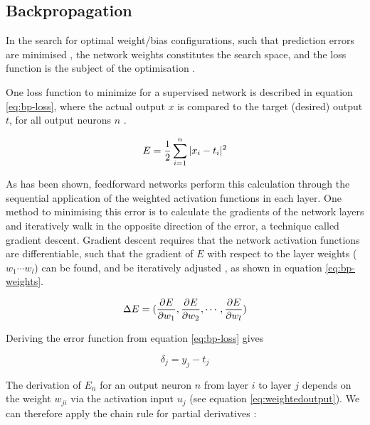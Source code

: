 \documentclass[report.tex]{subfiles}
\begin{document}
\subsection{Backpropagation}
In the search for optimal weight/bias configurations,
such that prediction errors are minimised \cite{Rumelhart1988},
the network weights constitutes the search space, 
and the loss function 
is the subject of the optimisation \cite{Russel2007}.

One loss function to minimize for a supervised network
is described in equation \ref{eq:bp-loss},
where the actual output $x$ is compared to the 
target (desired) output $t$, for all output neurons $n$
\cite{Russel2007}.

\begin{equation}
  E = {1 \over 2} \sum_{i=1}^n |x_i - t_i|^2
  \label{eq:bp-loss}
\end{equation}

As has been shown, feedforward networks perform this calculation
through the sequential application of the weighted activation
functions in each layer.
One method to minimising this error is
to calculate the gradients of the network layers and iteratively walk in
the opposite direction of the error, a technique called gradient
descent\cite{Rumelhart1988, Russel2007}.
Gradient descent requires that the network
activation functions are differentiable,
such that the gradient of $E$ with respect to the layer weights
($w_1 \cdots w_l$) can be found, and be iteratively
adjusted \cite{Rojas1996}, as shown in equation \ref{eq:bp-weights}.

\begin{equation}
  \Delta E = (
    {\partial E \over \partial w_1}, 
    {\partial E \over \partial w_2},
    \cdots, 
    {\partial E \over \partial w_l}
  )
  \label{eq:bp-weights}
\end{equation}

Deriving the error function from equation \ref{eq:bp-loss} gives

\begin{equation}
  \delta_j = y_j - t_j
  \label{eq:bp-loss-prime}
\end{equation}

The derivation of $E_n$ for an output neuron $n$ from layer $i$ to layer $j$
depends on the weight $w_{ji}$ via the activation input $u_j$ (see equation
\ref{eq:weightedoutput}).
We can therefore apply the chain rule for partial derivatives \cite{Bishop2006}:
\end{document}

